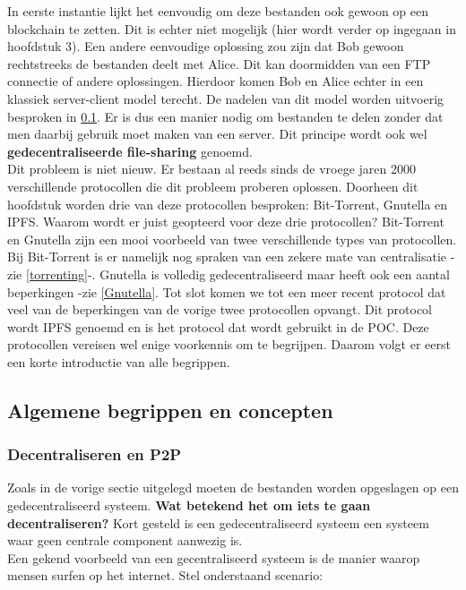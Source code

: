 In eerste instantie lijkt het eenvoudig om deze bestanden ook gewoon op een blockchain te zetten. Dit is echter niet mogelijk (hier wordt verder op ingegaan in hoofdstuk 3). Een andere eenvoudige oplossing zou zijn dat Bob gewoon rechtstreeks de bestanden deelt met Alice. Dit kan doormidden van een FTP connectie of andere oplossingen. Hierdoor komen Bob en Alice echter in een klassiek server-client model terecht. De nadelen van dit model worden uitvoerig besproken in \ref{ipfs_decent}. Er is dus een manier nodig om bestanden te delen zonder dat men daarbij gebruik moet maken van een server. Dit principe wordt ook wel \textbf{gedecentraliseerde file-sharing} genoemd.\\

Dit probleem is niet nieuw. Er bestaan al reeds sinds de vroege jaren 2000 verschillende protocollen die dit probleem proberen oplossen. Doorheen dit hoofdstuk worden drie van deze protocollen besproken: Bit-Torrent, Gnutella en IPFS. Waarom wordt er juist geopteerd voor deze drie protocollen? Bit-Torrent en Gnutella zijn een mooi voorbeeld van twee verschillende types van protocollen. Bij Bit-Torrent is er namelijk nog spraken van een zekere mate van centralisatie -zie \ref{torrenting}-. Gnutella is volledig gedecentraliseerd maar heeft ook een aantal beperkingen -zie \ref{Gnutella}. Tot slot komen we tot een meer recent protocol dat veel van de beperkingen van de vorige twee protocollen opvangt. Dit protocol wordt IPFS genoemd en is het protocol dat wordt gebruikt in de POC. Deze protocollen vereisen wel enige voorkennis om te begrijpen. Daarom volgt er eerst een korte introductie van alle begrippen.
\subsection{Algemene begrippen en concepten}
\label{ipfs_decent}

\subsubsection{Decentraliseren en P2P}
Zoals in de vorige sectie uitgelegd moeten de bestanden worden opgeslagen op een gedecentraliseerd systeem. \textbf{Wat betekend het om iets te gaan decentraliseren?} Kort gesteld is een gedecentraliseerd systeem een systeem waar geen centrale component aanwezig is.\\

Een gekend voorbeeld van een gecentraliseerd systeem is de manier waarop mensen surfen op het internet. Stel onderstaand scenario:\\

